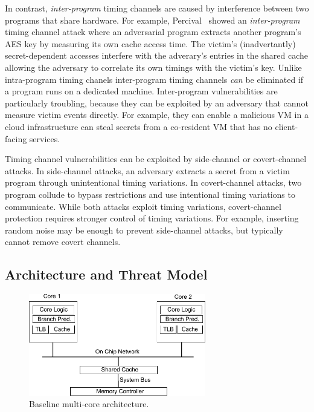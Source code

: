 In contrast, {\em inter-program} timing channels are caused by interference 
between two programs that share hardware.
For example, Percival~\cite{percival} showed an {\em inter-program} timing 
channel attack where an adversarial program extracts another program's AES key
by measuring its own cache access time. The victim's (inadvertantly)
secret-dependent accesses interfere with the adverary's entries in the shared
cache allowing the adversary to correlate its own timings with the victim's key. 
Unlike intra-program timing chanels inter-program timing channels {\em can} be
eliminated if a program runs on a dedicated machine. Inter-program 
vulnerabilities are particularly troubling, because they can be exploited by an 
adversary that cannot measure victim events directly. For example, they can 
enable a malicious VM in a cloud infrastructure can steal secrets from a
co-resident VM that has no client-facing services.

Timing channel vulnerabilities can be exploited by side-channel or 
covert-channel attacks. In side-channel attacks, an adversary extracts a secret from
a victim program through unintentional timing variations.
In covert-channel attacks, two program collude to bypass restrictions and use
intentional timing variations to communicate.
While both attacks exploit timing variations, covert-channel protection requires
stronger control of timing variations. For example, inserting random noise may be
enough to prevent side-channel attacks, but typically cannot remove covert channels.

\subsection{Architecture and Threat Model}


    \begin{figure}
        \begin{center}
            \includegraphics[width=3.04in]{figs/baseline.pdf}
            \caption{Baseline multi-core architecture.}
            \label{fig:baseline}
        \end{center}
    \end{figure}

